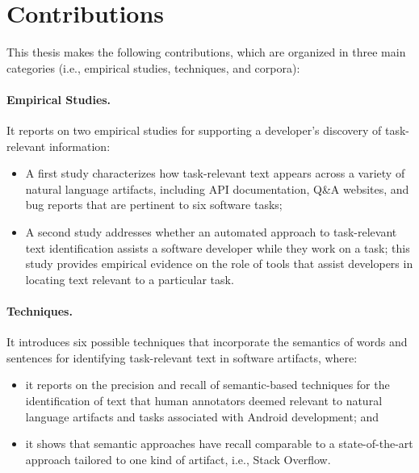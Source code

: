 

\section{Contributions}
\label{cp1:contributions}

This thesis makes the following contributions, 
which are organized 
in three main categories
(i.e., empirical studies, techniques, and corpora):




\paragraph{\textbf{Empirical Studies.}} 

It reports on two empirical studies for supporting a developer's discovery of task-relevant information:

\begin{itemize}

    \item A first study characterizes how task-relevant text appears across a variety of natural language artifacts, including  API documentation, Q\&A websites, and
    bug reports that are pertinent to six software tasks; 

    \item A second study addresses whether 
    an automated approach to task-relevant text identification assists a software developer while they work on a task; this study provides empirical evidence on the role of tools that assist developers in locating 
    text relevant to a particular task.
\end{itemize}




\paragraph{\textbf{Techniques.}} 

It introduces six possible techniques that incorporate the semantics of words and sentences for identifying task-relevant text in software artifacts, where:
    
\begin{itemize}
    
    \item it reports on the precision and recall of semantic-based techniques for the identification of text that human annotators deemed relevant to natural language artifacts and tasks associated with Android development; and

    \item it shows that semantic approaches have recall comparable to a state-of-the-art approach
    tailored to one kind of artifact, i.e., Stack Overflow.
\end{itemize}

